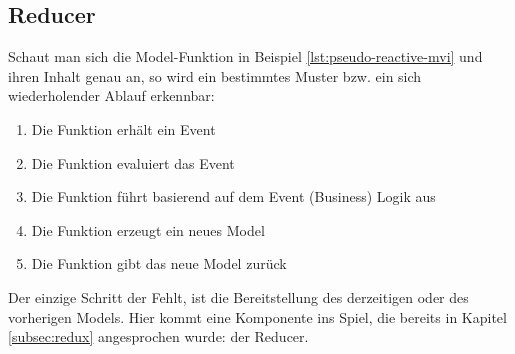 \subsection{Reducer}
Schaut man sich die Model-Funktion in Beispiel \ref{lst:pseudo-reactive-mvi} und ihren Inhalt genau an, so wird ein bestimmtes Muster bzw. ein sich wiederholender Ablauf erkennbar:
\\
\begin{enumerate}
	\item Die Funktion erhält ein Event 
	\item Die Funktion evaluiert das Event
	\item Die Funktion führt basierend auf dem Event (Business) Logik aus
	\item Die Funktion erzeugt ein neues Model
	\item Die Funktion gibt das neue Model zurück
\end{enumerate}
Der einzige Schritt der Fehlt, ist die Bereitstellung des derzeitigen oder des vorherigen Models. Hier kommt eine Komponente ins Spiel, die bereits in Kapitel \ref{subsec:redux} angesprochen wurde: der Reducer.
